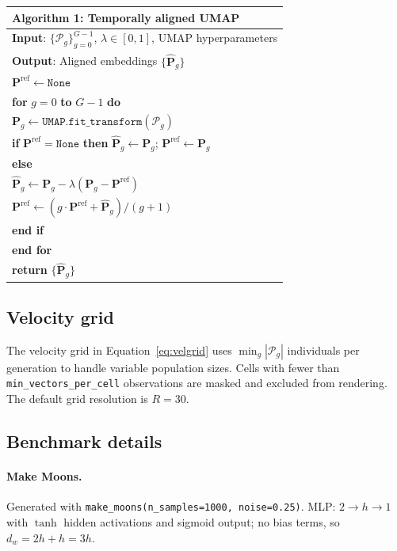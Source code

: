 \documentclass{article}
\begin{document}
\begin{center}
\small
\begin{tabular}{l}
\toprule
\textbf{Algorithm 1}: Temporally aligned UMAP \\
\midrule
\textbf{Input}: $\{\mathcal{P}_g\}_{g=0}^{G-1}$, $\lambda \in [0,1]$,
               UMAP hyperparameters \\
\textbf{Output}: Aligned embeddings $\{\hat{\mathbf{P}}_g\}$ \\
\midrule
$\mathbf{P}^{\text{ref}} \leftarrow \texttt{None}$ \\
\textbf{for} $g = 0$ \textbf{to} $G-1$ \textbf{do} \\
\quad $\mathbf{P}_g \leftarrow \texttt{UMAP.fit\_transform}(\mathcal{P}_g)$ \\
\quad \textbf{if} $\mathbf{P}^{\text{ref}} = \texttt{None}$ \textbf{then}
      $\hat{\mathbf{P}}_g \leftarrow \mathbf{P}_g$;
      $\mathbf{P}^{\text{ref}} \leftarrow \mathbf{P}_g$ \\
\quad \textbf{else} \\
\quad\quad $\hat{\mathbf{P}}_g \leftarrow
      \mathbf{P}_g - \lambda(\mathbf{P}_g - \mathbf{P}^{\text{ref}})$ \\
\quad\quad $\mathbf{P}^{\text{ref}} \leftarrow
      (g \cdot \mathbf{P}^{\text{ref}} + \hat{\mathbf{P}}_g) / (g+1)$ \\
\quad \textbf{end if} \\
\textbf{end for} \\
\textbf{return} $\{\hat{\mathbf{P}}_g\}$ \\
\bottomrule
\end{tabular}
\end{center}

\subsection{Velocity grid}

The velocity grid in Equation~\eqref{eq:velgrid} uses
$\min_g |\mathcal{P}_g|$ individuals per generation to handle variable
population sizes.
Cells with fewer than \texttt{min\_vectors\_per\_cell} observations are masked
and excluded from rendering.
The default grid resolution is $R = 30$.

\subsection{Benchmark details}

\paragraph{Make Moons.}
Generated with \texttt{make\_moons(n\_samples=1000, noise=0.25)}.
MLP: $2 \to h \to 1$ with $\tanh$ hidden activations and sigmoid output;
no bias terms, so $d_w = 2h + h = 3h$.
\end{document}
